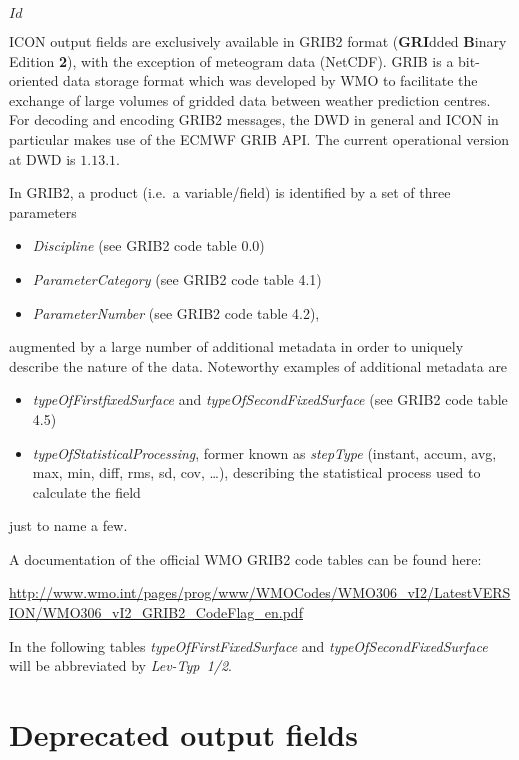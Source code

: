 \svnInfo $Id$

ICON output fields are exclusively available in GRIB2 format (\textbf{GRI}dded \textbf{B}inary Edition \textbf{2}), with the exception of 
meteogram data (NetCDF). GRIB is a bit-oriented data storage format which was developed by WMO to facilitate the exchange of large volumes of 
gridded data between weather prediction centres. For decoding and encoding GRIB2 messages, the DWD in general and ICON in particular 
makes use of the ECMWF GRIB API. The current operational version at DWD is $1.13.1$.
 
In GRIB2, a product (i.e.\ a variable/field) is identified by a set of three parameters
\begin{itemize}
 \item \emph{Discipline} (see GRIB2 code table 0.0)
 \item \emph{ParameterCategory} (see GRIB2 code table 4.1)
 \item \emph{ParameterNumber} (see GRIB2 code table 4.2), 
\end{itemize}
augmented by a large number of additional metadata in order to uniquely describe the nature of the data. Noteworthy examples 
of additional metadata are 
\begin{itemize}
  \item \emph{typeOfFirstfixedSurface} and \emph{typeOfSecondFixedSurface} (see GRIB2 code table 4.5)
  \item \emph{typeOfStatisticalProcessing}, former known as \emph{stepType} (instant, accum, avg, max, min, diff, rms, sd, cov, \dots),
        describing the statistical process used to calculate the field
 \end{itemize}
just to name a few.

A documentation of the official WMO GRIB2 code tables can be found here: 

\begin{minipage}{\textwidth}
\url{http://www.wmo.int/pages/prog/www/WMOCodes/WMO306_vI2/LatestVERSION/WMO306_vI2_GRIB2_CodeFlag_en.pdf}
\end{minipage}

In the following tables \emph{typeOfFirstFixedSurface} and \emph{typeOfSecondFixedSurface} will be abbreviated by \emph{Lev-Typ~1/2}.



\section{Deprecated output fields}

